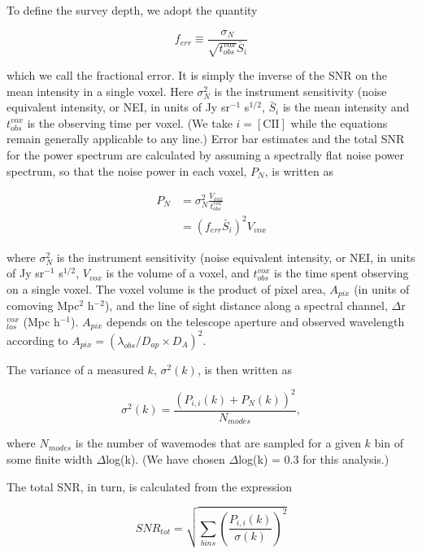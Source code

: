 \documentclass[iop]{emulateapj}
\begin{document}
To define the survey depth, we adopt the quantity 

\begin{equation}
f_{err} \equiv \frac{\sigma_N}{\sqrt{t_{obs}^{vox}} \bar{S}_i}
\label{eq:ferr}
\end{equation}

which we call the fractional error. It is simply the inverse of the SNR on the mean intensity in a single voxel. Here $\sigma_N^2$ is the instrument sensitivity (noise equivalent intensity, or NEI, in units of Jy sr$^{-1}$ s$^{1/2}$, $\bar{S}_i$ is the mean intensity and $t_{obs}^{vox}$ is the observing time per voxel. (We take $i=\mathrm{[CII]}$ while the equations remain generally applicable to any line.) Error bar estimates and the total SNR for the power spectrum are calculated by assuming a spectrally flat noise power spectrum, so that the noise power in each voxel, $P_{N}$, is written as

\begin{align}
P_N & = \sigma_N^2 \frac{V_{vox}}{t_{obs}^{vox}} \\
& = \left(f_{err} \bar{S}_i \right)^2 V_{vox} \nonumber
\end{align}

where $\sigma_N^2$ is the instrument sensitivity (noise equivalent intensity, or NEI, in units of Jy sr$^{-1}$ s$^{1/2}$, $V_{vox}$ is the volume of a voxel, and $t_{obs}^{vox}$ is the time spent observing on a single voxel. The voxel volume is the product of pixel area, $A_{pix}$ (in units of comoving Mpc$^2$ h$^{-2}$), and the line of sight distance along a spectral channel, $\Delta$r$_{los}^{vox}$ (Mpc h$^{-1}$). $A_{pix}$ depends on the telescope aperture and observed wavelength according to $A_{pix} = (\lambda_{obs}/D_{ap}\times D_{A})^2$.

The variance of a measured $k$, $\sigma^2(k)$, is then written as

\begin{equation}
\sigma^2(k) = \frac{\left({P_{i,i}(k) + P_N(k)}\right)^{2}}{N_{modes}},
\end{equation}

where $N_{modes}$ is the number of wavemodes that are sampled for a given $k$ bin of some finite width $\Delta$log(k). (We have chosen $\Delta$log(k) = 0.3 for this analysis.)

The total SNR, in turn, is calculated from the expression 

\begin{equation}
SNR_{tot} = \sqrt{\sum_{bins} \left(\frac{P_{i,i}(k)}{\sigma(k)}\right)^2}
\end{equation}
\end{document}
